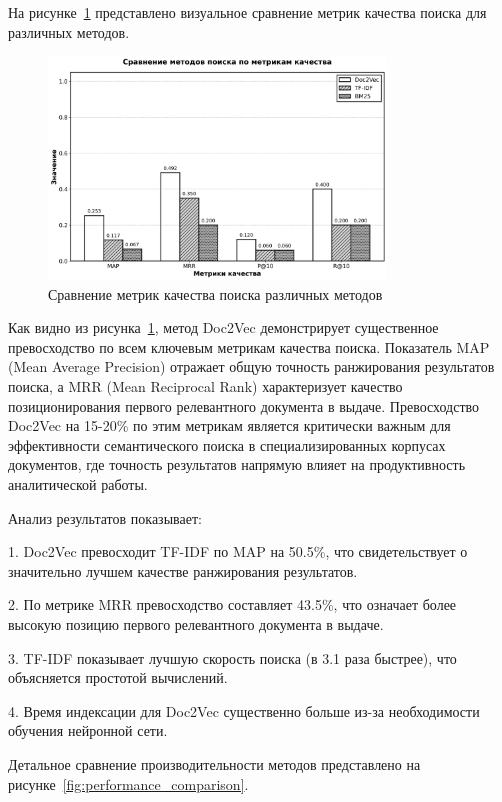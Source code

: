 На рисунке~\ref{fig:quality_metrics} представлено визуальное сравнение метрик качества поиска для различных методов.

\begin{figure}[H]
	\centering
	\includegraphics[width=0.8\textwidth]{images/diploma_bw_plots/quality_metrics_bw.png}
	\caption{Сравнение метрик качества поиска различных методов}
	\label{fig:quality_metrics}
\end{figure}

Как видно из рисунка~\ref{fig:quality_metrics}, метод Doc2Vec демонстрирует существенное превосходство по всем ключевым метрикам качества поиска. Показатель MAP (Mean Average Precision) отражает общую точность ранжирования результатов поиска, а MRR (Mean Reciprocal Rank) характеризует качество позиционирования первого релевантного документа в выдаче. Превосходство Doc2Vec на 15-20\% по этим метрикам является критически важным для эффективности семантического поиска в специализированных корпусах документов, где точность результатов напрямую влияет на продуктивность аналитической работы.

Анализ результатов показывает:

1. Doc2Vec превосходит TF-IDF по MAP на 50.5\%, что свидетельствует о значительно лучшем качестве ранжирования результатов.

2. По метрике MRR превосходство составляет 43.5\%, что означает более высокую позицию первого релевантного документа в выдаче.

3. TF-IDF показывает лучшую скорость поиска (в 3.1 раза быстрее), что объясняется простотой вычислений.

4. Время индексации для Doc2Vec существенно больше из-за необходимости обучения нейронной сети.

Детальное сравнение производительности методов представлено на рисунке~\ref{fig:performance_comparison}.


